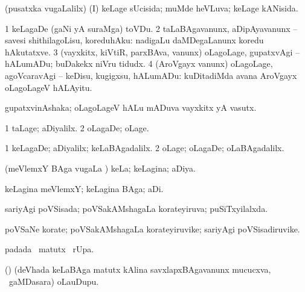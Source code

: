 \bentry
{} 
\gl{\gu}
\expl{}
\bmng
(pusatxka \mo vugaLalilx) (I) keLage sUcisida; muMde heVLuva; keLage kANisida. 
\emng
\eentry

\bentry
{} 
\gl{\sakirx}
\expl{}
\bmng
\bnum
\num{1} keLagaDe (gaNi yA suraMga) toVDu. 
\num{2} taLaBAgavanunx, aDipAyavanunx -- savesi shithilagoLisu, koreduhAku:  nadigaLu daMDegaLanunx koredu hAkutatxve. 
\num{3} (vayxkitx, kiVtiR, parxBAva, \mo vanunx) oLagoLage, gupatxvAgi -- hALumADu; buDakekx niVru tidudx. 
\num{4} (AroVgayx \mo vanunx) oLagoLage, agoVcaravAgi -- keDisu, kugigxsu, hALumADu:  kuDitadiMda avana AroVgayx oLagoLageV hALAyitu. 
\enum
\emng
\eentry

\bentry
{} 
\gl{\nA}
\expl{}
\bmng
 gupatxvinAshaka; oLagoLageV hALu mADuva vayxkitx yA vasutx. 
\emng
\eentry

\bentry
{} 
\gl{\kirxvi}
\expl{}
\bmng
\bnum
\num{1} taLage; aDiyalilx. 
\num{2} oLagaDe; oLage. 
\enum
\emng
\eentry

\bentry
{} 
\gl{\upa}
\bmng
\bnum
\num{1} keLagaDe; aDiyalilx; keLaBAgadalilx. 
\num{2} oLage; oLagaDe; oLaBAgadalilx. 
\enum
\emng
\eentry

\bentry
{} 
\gl{\gu}
\expl{}
\bmng
 (meVlemxY BAga \mo vugaLa \vi) keLa; keLagina; aDiya. 
\emng
\eentry

\bentry
{} 
\gl{\nA}
\expl{}
\bmng
 keLagina meVlemxY; keLagina BAga; aDi. 
\emng
\eentry

\bentry
{} 
\gl{\gu}
\expl{}
\bmng
 sariyAgi poVSisada; poVSakAMshagaLa korateyiruva; puSiTxyilalxda. 
\emng
\eentry

\bentry
{} 
\gl{\nA}
\expl{}
\bmng
 poVSaNe korate; poVSakAMshagaLa korateyiruvike; sariyAgi poVSisadiruvike. 
\emng
\eentry

\bentry
{} 
\gl{\kirx}
\expl{}
\bmng
  padada \BU\ matutx \BUkaq\ rUpa. 
\emng
\eentry

\bentry
{} 
\gl{\nA}
\expl{}
\bmng
 (\bava) (deVhada keLaBAga matutx kAlina savxlapxBAgavanunx mucucxva, \kanmu\ gaMDasara) oLauDupu. 
\emng
\eentry

